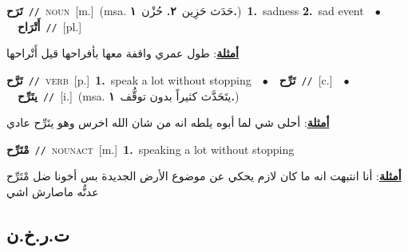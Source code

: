 \documentclass[10pt,a4paper,twoside]{article} %
\begin{document}
\begin{multicols}{2}
{\setlength\topsep{0pt}\textbf{\foreignlanguage{arabic}{تَرَح}}\ {\color{gray}\texttt{//}\color{black}}\ \textsc{noun}\ [m.]\ \color{gray}(msa. \foreignlanguage{arabic}{حَدَث حَزِين}~\foreignlanguage{arabic}{\textbf{٢.}}  \foreignlanguage{arabic}{حُزْن}~\foreignlanguage{arabic}{\textbf{١.}})\color{black}\ \textbf{1.}~sadness  \textbf{2.}~sad event\ \ $\bullet$\ \ \setlength\topsep{0pt}\textbf{\foreignlanguage{arabic}{أَتْرَاح}}\ {\color{gray}\texttt{//}\color{black}}\ [pl.]\  \begin{flushright}\color{gray}\foreignlanguage{arabic}{\textbf{\underline{\foreignlanguage{arabic}{أمثلة}}}: طول عمري واقفة معها بأفراحها قيل أَتْراحها}\end{flushright}\color{black}} \vspace{2mm}

{\setlength\topsep{0pt}\textbf{\foreignlanguage{arabic}{تَرَّح}}\ {\color{gray}\texttt{//}\color{black}}\ \textsc{verb}\ [p.]\ \textbf{1.}~speak a lot without stopping\ \ $\bullet$\ \ \setlength\topsep{0pt}\textbf{\foreignlanguage{arabic}{تَرِّح}}\ {\color{gray}\texttt{//}\color{black}}\ [c.]\ \ $\bullet$\ \ \setlength\topsep{0pt}\textbf{\foreignlanguage{arabic}{يتَرِّح}}\ {\color{gray}\texttt{//}\color{black}}\ [i.]\ \color{gray}(msa. \foreignlanguage{arabic}{يتَحَدَّث كثيراً بدون توقُّف}~\foreignlanguage{arabic}{\textbf{١.}})\color{black}\  \begin{flushright}\color{gray}\foreignlanguage{arabic}{\textbf{\underline{\foreignlanguage{arabic}{أمثلة}}}: أحلى شي لما أبوه يلطه انه من شان الله اخرس وهو يتَرِّح عادي}\end{flushright}\color{black}} \vspace{2mm}

{\setlength\topsep{0pt}\textbf{\foreignlanguage{arabic}{مْتَرِّح}}\ {\color{gray}\texttt{//}\color{black}}\ \textsc{noun\textunderscore act}\ [m.]\ \textbf{1.}~speaking a lot without stopping\  \begin{flushright}\color{gray}\foreignlanguage{arabic}{\textbf{\underline{\foreignlanguage{arabic}{أمثلة}}}: أنا انتبهت انه ما كان لازم يحكي عن موضوع الأرض الجديدة بس أخونا ضل مْتَرِّح عدنُّه ماصارش اشي}\end{flushright}\color{black}} \vspace{2mm}

\vspace{-3mm}
\subsection*{\color{blue}\foreignlanguage{arabic}{ت.ر.خ.ن}\color{blue}{}} 


\end{multicols}
\end{document}
